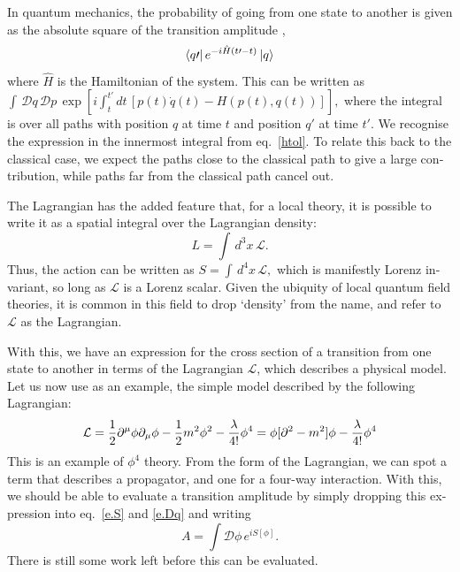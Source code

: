 \begin{english}
In quantum mechanics, the probability of going from one state to another is given as the absolute square of the transition amplitude \cite{sred:tramp},
\[\left\langle q\prime \right|e^{-i\hat H(t\prime-t)}\left| q \right\rangle\]
where $\hat H$ is the Hamiltonian of the system. This can be written as
\(\int\,\mathcal Dq\,\mathcal Dp\,\exp\left[i\int_t^{t\prime}dt\,[p(t)\dot q(t)-H(p(t),q(t))]\right],\label{e.Dq}\)
where the integral is over all paths with position $q$ at time $t$ and position $q\prime$ at time $t\prime$. We recognise the expression in the innermost integral from eq.~\eqref{htol}. To relate this back to the classical case, we expect the paths close to the classical path to give a large contribution, while paths far from the classical path cancel out.

The Lagrangian has the added feature that, for a local theory, it is possible to write it as a spatial integral over the Lagrangian density:
\[L=\int \,d^3x\,\mathcal L.\]
Thus, the action can be written as
\(S=\int\,d^4x\,\mathcal L,\label{e.S}\)
which is manifestly Lorenz invariant, so long as $\mathcal L$ is a Lorenz scalar. Given the ubiquity of local quantum field theories, it is common in this field to drop `density' from the name, and refer to $\mathcal L$ as the Lagrangian.

With this, we have an expression for the cross section of a transition from one state to another in terms of the Lagrangian $\mathcal L$, which describes a physical model. Let us now use as an example, the simple model described by the following Lagrangian:
\[\mathcal L= \frac{1}{2}\partial^\mu\phi\partial_\mu\phi-\frac{1}{2} m^2\phi^2-\frac{\lambda}{4!}\phi^4=\phi[\partial^2-m^2]\phi-\frac{\lambda}{4!}\phi^4\]
This is an example of $\phi^4$ theory. From the form of the Lagrangian, we can spot a term that describes a propagator, and one for a four-way interaction. With this, we should be able to evaluate a transition amplitude by simply dropping this expression into eq.~\eqref{e.S} and \eqref{e.Dq} and writing
\[A = \int\mathcal D\phi\,e^{iS[\phi]}.\label{e.Dphi}\]
There is still some work left before this can be evaluated.


\end{english}
